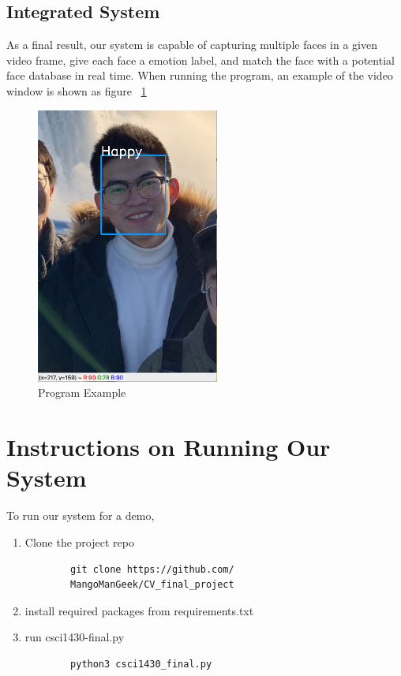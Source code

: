\documentclass[10pt,twocolumn,letterpaper]{article}
\begin{document}
\subsection{Integrated System}
As a final result, our system is capable of capturing multiple faces in a given video frame, give each face a emotion label, and match the face with a potential face database in real time. When running the program, an example of the video window is shown as figure ~\ref{fig:face}
\begin{figure}[h]
    \centering
    \includegraphics[width=6cm]{face.png}
    \caption{Program Example}
    \label{fig:face}
\end{figure}

\section{Instructions on Running Our System}
To run our system for a demo,
\begin{enumerate}
    \item Clone the project repo
    \begin{verbatim}
        git clone https://github.com/
        MangoManGeek/CV_final_project
    \end{verbatim}
    
    \item install required packages from requirements.txt
    \item run csci1430-final.py
    \begin{verbatim}
        python3 csci1430_final.py
    \end{verbatim}
\end{enumerate}
\end{document}
